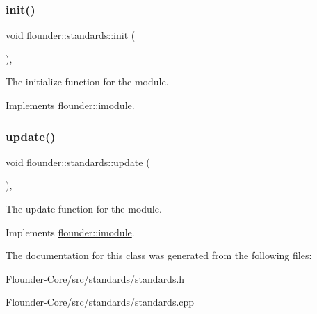 \subsubsection{\texorpdfstring{init()}{init()}}
{\footnotesize\ttfamily void flounder\+::standards\+::init (\begin{DoxyParamCaption}{ }\end{DoxyParamCaption})\hspace{0.3cm}{\ttfamily [override]}, {\ttfamily [virtual]}}



The initialize function for the module. 



Implements \hyperlink{classflounder_1_1imodule_a1725ef346952884d0741de61aba1e0c7}{flounder\+::imodule}.

\mbox{\label{classflounder_1_1standards_a681e682db67c10abb814cf0f8daf086a}} 
\subsubsection{\texorpdfstring{update()}{update()}}
{\footnotesize\ttfamily void flounder\+::standards\+::update (\begin{DoxyParamCaption}{ }\end{DoxyParamCaption})\hspace{0.3cm}{\ttfamily [override]}, {\ttfamily [virtual]}}



The update function for the module. 



Implements \hyperlink{classflounder_1_1imodule_a9a53d48a46b5f6b16a92b2cd8503f74a}{flounder\+::imodule}.



The documentation for this class was generated from the following files\+:\begin{DoxyCompactItemize}
\item 
Flounder-\/\+Core/src/standards/standards.\+h\item 
Flounder-\/\+Core/src/standards/standards.\+cpp\end{DoxyCompactItemize}

